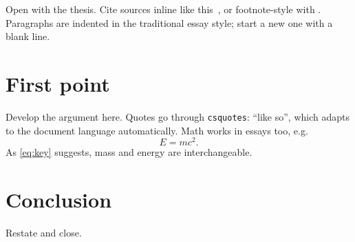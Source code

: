 \documentclass[11pt]{article}
\begin{document}
\maketitle

Open with the thesis. Cite sources inline like this~\parencite{knuth1984texbook},
or footnote-style with \autocite{lamport1994latex}. Paragraphs are indented in the
traditional essay style; start a new one with a blank line.

\section{First point}

Develop the argument here. Quotes go through \texttt{csquotes}: \enquote{like so},
which adapts to the document language automatically. Math works in essays too, e.g.
\begin{equation}\label{eq:key}
	E = mc^2 .
\end{equation}
As \cref{eq:key} suggests, mass and energy are interchangeable.

\section{Conclusion}

Restate and close.


\printbibliography
\end{document}

